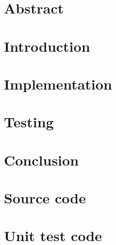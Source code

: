 \documentclass[12pt]{report}
\author{Chiemerie Ezechukwu}
\begin{document}
  

  \chapter*{Abstract}
  


  \renewcommand{\contentsname}{Table of Contents}
  \setlength{\parskip}{0pt}
  \tableofcontents
  \listoffigures
  \printacronyms

  \setlength{\parskip}{\baselineskip}

  \chapter{Introduction}
  

  \chapter{Implementation}
  

  \chapter{Testing}
  

  \chapter{Conclusion}
  

  \cleardoublepage
  
  \renewcommand{\bibname}{References}
  

  \appendix

  \chapter{Source code}\label{appendix:sourcecode}
  

  \chapter{Unit test code}\label{appendix:unittest}
  
\end{document}
